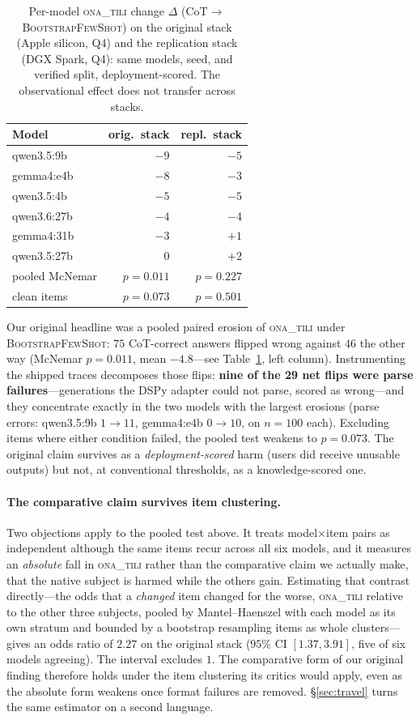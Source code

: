 \documentclass[11pt]{article}
\newcommand{\ona}{\textsc{ona\_tili}}
\newcommand{\bsfs}{\textsc{BootstrapFewShot}}
\begin{document}
\begin{table}[t]\centering\small
\caption{Per-model \ona{} change $\Delta$ (CoT${\to}$\bsfs{}) on the original stack
(Apple silicon, Q4) and the replication stack (DGX Spark, Q4): same models, seed, and
verified split, deployment-scored. The observational effect does not transfer across
stacks.}
\label{tab:twostacks}
\setlength{\tabcolsep}{4pt}
\begin{tabular}{lrr}
\toprule
Model & orig.\ stack & repl.\ stack \\
\midrule
qwen3.5:9b   & $-9$ & $-5$ \\
gemma4:e4b   & $-8$ & $-3$ \\
qwen3.5:4b   & $-5$ & $-5$ \\
qwen3.6:27b  & $-4$ & $-4$ \\
gemma4:31b   & $-3$ & $+1$ \\
qwen3.5:27b  & $\phantom{-}0$ & $+2$ \\
\midrule
pooled McNemar & $p{=}0.011$ & $p{=}0.227$ \\
\quad clean items & $p{=}0.073$ & $p{=}0.501$ \\
\bottomrule
\end{tabular}
\end{table}

Our original headline was a pooled paired erosion of \ona{} under \bsfs{}: $75$
CoT-correct answers flipped wrong against $46$ the other way (McNemar $p{=}0.011$,
mean $-4.8$---see Table~\ref{tab:twostacks}, left column). Instrumenting the shipped traces
decomposes those flips: \textbf{nine of the 29 net flips were parse
failures}---generations the DSPy adapter could not parse, scored as wrong---and they
concentrate exactly in the two models with the largest erosions (parse errors:
qwen3.5:9b $1{\to}11$, gemma4:e4b $0{\to}10$, on $n{=}100$ each). Excluding items where
either condition failed, the pooled test weakens to $p{=}0.073$. The original claim
survives as a \emph{deployment-scored} harm (users did receive unusable outputs) but
not, at conventional thresholds, as a knowledge-scored one.

\paragraph{The comparative claim survives item clustering.} Two objections apply to the
pooled test above. It treats model$\times$item pairs as independent although the same
items recur across all six models, and it measures an \emph{absolute} fall in \ona{}
rather than the comparative claim we actually make, that the native subject is harmed
while the others gain. Estimating that contrast directly---the odds that a
\emph{changed} item changed for the worse, \ona{} relative to the other three subjects,
pooled by Mantel--Haenszel with each model as its own stratum and bounded by a bootstrap
resampling items as whole clusters---gives an odds ratio of $2.27$ on the original stack
($95\%$ CI $[1.37, 3.91]$, five of six models agreeing). The interval excludes $1$. The
comparative form of our original finding therefore holds under the item clustering its
critics would apply, even as the absolute form weakens once format failures are removed.
\S\ref{sec:travel} turns the same estimator on a second language.
\end{document}
